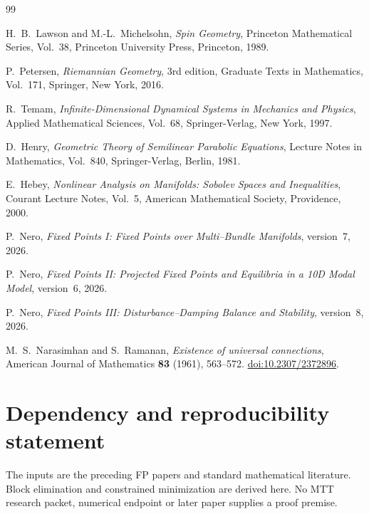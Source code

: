 \documentclass[11pt]{article}
\begin{document}
\begin{thebibliography}{99}

H.~B.~Lawson and M.-L.~Michelsohn,
\newblock \emph{Spin Geometry},
\newblock Princeton Mathematical Series, Vol.~38,
\newblock Princeton University Press, Princeton, 1989.

P.~Petersen,
\newblock \emph{Riemannian Geometry},
\newblock 3rd edition,
\newblock Graduate Texts in Mathematics, Vol.~171,
\newblock Springer, New York, 2016.

R.~Temam,
\newblock \emph{Infinite-Dimensional Dynamical Systems in Mechanics and Physics},
\newblock Applied Mathematical Sciences, Vol.~68,
\newblock Springer-Verlag, New York, 1997.

D.~Henry,
\newblock \emph{Geometric Theory of Semilinear Parabolic Equations},
\newblock Lecture Notes in Mathematics, Vol.~840,
\newblock Springer-Verlag, Berlin, 1981.

E.~Hebey,
\newblock \emph{Nonlinear Analysis on Manifolds: Sobolev Spaces and Inequalities},
\newblock Courant Lecture Notes, Vol.~5,
\newblock American Mathematical Society, Providence, 2000.

P.~Nero, \emph{Fixed Points I: Fixed Points over Multi--Bundle Manifolds},
version~7, 2026.

P.~Nero, \emph{Fixed Points II: Projected Fixed Points and Equilibria in a
10D Modal Model}, version~6, 2026.

P.~Nero, \emph{Fixed Points III: Disturbance--Damping Balance and Stability},
version~8, 2026.

M.~S.~Narasimhan and S.~Ramanan,
\emph{Existence of universal connections},
American Journal of Mathematics \textbf{83} (1961), 563--572.
\href{https://doi.org/10.2307/2372896}{doi:10.2307/2372896}.

\end{thebibliography}


\section*{Dependency and reproducibility statement}
The inputs are the preceding FP papers and standard mathematical literature.
Block elimination and constrained minimization are derived here. No MTT
research packet, numerical endpoint or later paper supplies a proof premise.
\end{document}
